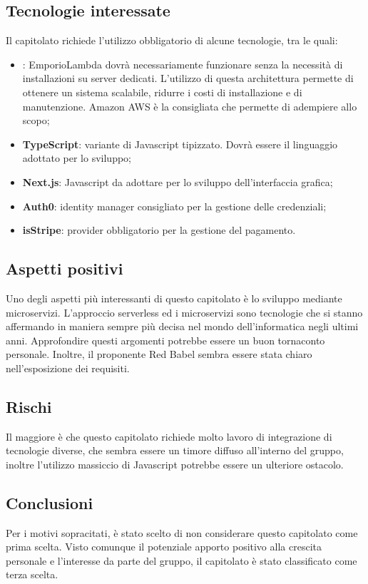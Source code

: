 \documentclass[../studio-di-fattibilita.tex]{subfiles}
\begin{document}
\subsection{Tecnologie interessate}%
\label{sub:c2_tecnologie_interessate}
Il capitolato richiede l’utilizzo obbligatorio di alcune tecnologie, tra le quali:
\begin{itemize}
  \item \textbf{}: EmporioLambda dovrà necessariamente funzionare senza la necessità di installazioni su server dedicati. L’utilizzo di questa architettura permette di ottenere un sistema scalabile, ridurre i costi di installazione e di manutenzione. Amazon AWS è la  consigliata che permette di adempiere allo scopo;
  \item \textbf{TypeScript}: variante di Javascript tipizzato. Dovrà essere il linguaggio adottato per lo sviluppo;
  \item \textbf{Next.js}:  Javascript da adottare per lo sviluppo dell’interfaccia grafica;
  \item \textbf{Auth0}: identity manager consigliato per la gestione delle credenziali;
  \item \textbf{isStripe}: provider obbligatorio per la gestione del pagamento.
\end{itemize}

\subsection{Aspetti positivi}%
\label{sub:c2_aspetti_positivi}
Uno degli aspetti più interessanti di questo capitolato è lo sviluppo mediante microservizi. L’approccio serverless ed i microservizi sono tecnologie che si stanno affermando in maniera sempre più decisa nel mondo dell’informatica negli ultimi anni. Approfondire questi argomenti potrebbe essere un buon tornaconto personale. Inoltre, il proponente Red Babel sembra essere stata chiaro nell’esposizione dei requisiti.

\subsection{Rischi}%
\label{sub:c2_rischi}
Il  maggiore è che questo capitolato richiede molto lavoro di integrazione di tecnologie diverse, che sembra essere un timore diffuso all’interno del gruppo, inoltre l’utilizzo massiccio di Javascript potrebbe essere un ulteriore ostacolo.

\subsection{Conclusioni}%
\label{sub:c2_conclusioni}
Per i motivi sopracitati, è stato scelto di non considerare questo capitolato come prima scelta. Visto comunque il potenziale apporto positivo alla crescita personale e l’interesse da parte del gruppo, il capitolato è stato classificato come terza scelta.
\end{document}
